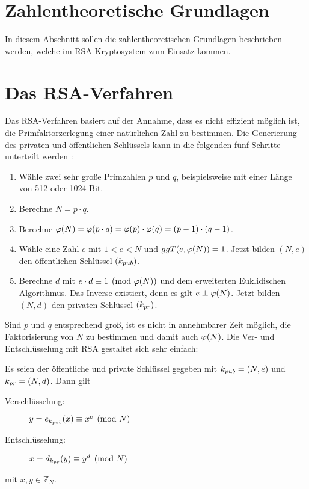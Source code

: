 \section{Zahlentheoretische Grundlagen}
In diesem Abschnitt sollen die zahlentheoretischen Grundlagen beschrieben werden,
welche im RSA-Kryptosystem zum Einsatz kommen.







\section{Das RSA-Verfahren}
Das RSA-Verfahren basiert auf der Annahme, dass es nicht effizient
möglich ist, die Primfaktorzerlegung einer natürlichen Zahl zu bestimmen.
Die Generierung des privaten und öffentlichen Schlüssels kann in die
folgenden fünf Schritte unterteilt werden \parencite[176]{BOOK:crypto}:
\newpage
\begin{definition}\mbox{}
  \begin{enumerate}
    \item Wähle zwei sehr große Primzahlen $p$ und $q$, beispielsweise mit einer Länge
          von 512 oder 1024 Bit.
    \item Berechne $N = p \cdot q$.
    \item Berechne $\varphi(N) = \varphi(p \cdot q) = \varphi(p) \cdot \varphi(q) = (p-1) \cdot (q-1)$.
    \item Wähle eine Zahl $e$ mit $1 < e < N$ und $ggT(e,\varphi(N)) = 1$. Jetzt bilden
          $(N,e)$ den öffentlichen Schlüssel $(k_{pub})$.
    \item Berechne $d$ mit $e \cdot d \equiv 1 \pmod{\varphi(N)}$ und dem erweiterten
          Euklidischen Algorithmus. Das Inverse existiert, denn es gilt $e \perp \varphi(N)$.
          Jetzt bilden $(N,d)$ den privaten Schlüssel $(k_{pr})$.
  \end{enumerate}
\end{definition}

\noindent
Sind $p$ und $q$ entsprechend groß, ist es nicht in annehmbarer Zeit möglich, die Faktorisierung
von $N$ zu bestimmen und damit auch $\varphi(N)$. Die Ver- und Entschlüsselung mit RSA
gestaltet sich sehr einfach:

\begin{definition}
  Es seien der öffentliche und private Schlüssel gegeben mit
  $k_{pub} = (N,e)$ und $k_{pr} = (N,d)$. Dann gilt
  \begin{description}
    \item[Verschlüsselung:] $y = e_{k_{pub}}(x) \equiv x^e \pmod{N}$
    \item[Entschlüsselung:] $x = d_{k_{pr}}(y) \equiv y^d \pmod{N}$
  \end{description}
  mit $x,y \in \mathbb{Z}_N$.
\end{definition}

